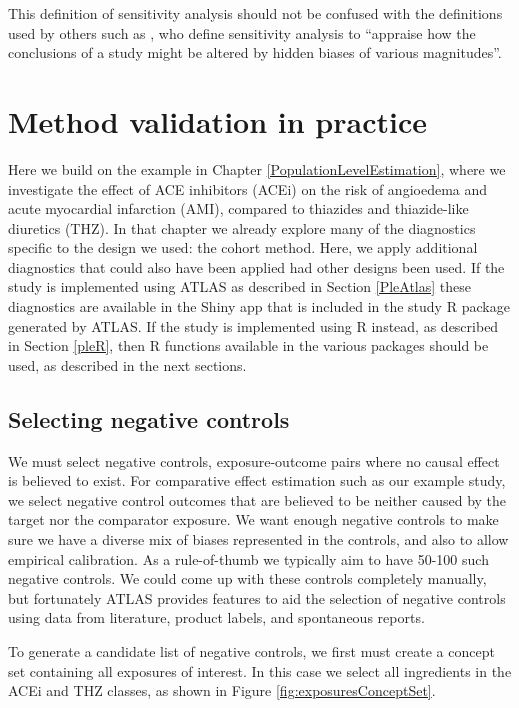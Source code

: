 \documentclass[11pt]{book}
\theoremstyle{definition}
\theoremstyle{definition}
\theoremstyle{definition}
\theoremstyle{remark}
\begin{document}
This definition of sensitivity analysis should not be confused with the definitions used by others such as \citet{rosenbaum_2005}, who define sensitivity analysis to ``appraise how the conclusions of a study might be altered by hidden biases of various magnitudes''.

\hypertarget{method-validation-in-practice}{%
\section{Method validation in practice}\label{method-validation-in-practice}}

Here we build on the example in Chapter \ref{PopulationLevelEstimation}, where we investigate the effect of ACE inhibitors (ACEi) on the risk of angioedema and acute myocardial infarction (AMI), compared to thiazides and thiazide-like diuretics (THZ). In that chapter we already explore many of the diagnostics specific to the design we used: the cohort method. Here, we apply additional diagnostics that could also have been applied had other designs been used. If the study is implemented using ATLAS as described in Section \ref{PleAtlas} these diagnostics are available in the Shiny app that is included in the study R package generated by ATLAS. If the study is implemented using R instead, as described in Section \ref{pleR}, then R functions available in the various packages should be used, as described in the next sections.

\hypertarget{selecting-negative-controls}{%
\subsection{Selecting negative controls}\label{selecting-negative-controls}}

We must select negative controls, exposure-outcome pairs where no causal effect is believed to exist. For comparative effect estimation such as our example study, we select negative control outcomes that are believed to be neither caused by the target nor the comparator exposure. We want enough negative controls to make sure we have a diverse mix of biases represented in the controls, and also to allow empirical calibration. As a rule-of-thumb we typically aim to have 50-100 such negative controls. We could come up with these controls completely manually, but fortunately ATLAS provides features to aid the selection of negative controls using data from literature, product labels, and spontaneous reports.

To generate a candidate list of negative controls, we first must create a concept set containing all exposures of interest. In this case we select all ingredients in the ACEi and THZ classes, as shown in Figure \ref{fig:exposuresConceptSet}.
\end{document}
